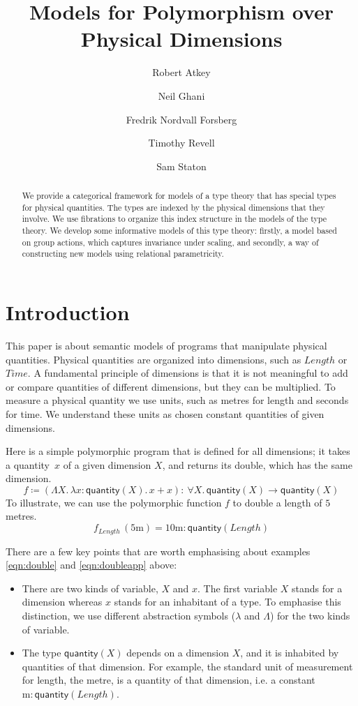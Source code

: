\documentclass[a4paper,UKenglish]{lipics}
\title{Models for Polymorphism over Physical Dimensions}
\author[1]{Robert Atkey}
\author[1]{Neil Ghani}
\author[1]{Fredrik Nordvall Forsberg}
\author[1]{Timothy Revell}
\author[2]{Sam Staton}
\affil[1]{University of Strathclyde}
\affil[2]{University of Oxford}
\theoremstyle{plain}
\newcommand{\msf}[1]{\mathsf{#1}} %
\newcommand{\qnt}{\msf{quantity}}
\newcommand{\lengthDim}{\mathit{Length}}
\newcommand{\timeDim}{\mathit{Time}}
\newcommand{\Dvar}{X}
\begin{document}
\maketitle

\begin{abstract}
We provide a categorical framework for models of a type theory that has special types for physical quantities. The types are indexed by the physical dimensions that they involve. We use fibrations to organize this index structure in the models of the type theory. We develop some informative models of this type theory: firstly, a model based on group actions, which captures invariance under scaling, and secondly, a way of constructing new models using relational parametricity.
\end{abstract}

\section{Introduction}
This paper is about semantic models of programs that manipulate physical quantities. Physical quantities are organized into dimensions, such as $\lengthDim$ or $\timeDim$. A fundamental principle of dimensions is that it is not meaningful to add or compare quantities of different dimensions, but they can be multiplied. 
%
To measure a physical quantity we use units, such as metres for length and seconds for time. We understand these units as chosen constant quantities of given dimensions.

Here is a simple polymorphic program that is defined for all dimensions; it takes a quantity~$x$ of a given dimension $X$, and returns its double, which has the same dimension.
\begin{equation}
f\coloneqq (\Lambda X.\,\lambda x:\qnt(X).\,x+x)
:\ \forall X.\,\qnt(X)\to \qnt(X)
\label{eqn:double}
\end{equation}
To illustrate, we can use the polymorphic function $f$ to double a length of $5$ metres.
\begin{equation}
f_\lengthDim\,(5\mathrm{m})=
10\mathrm{m}:\qnt(\lengthDim)
\label{eqn:doubleapp}
\end{equation}

\noindent There are a few key points that are worth emphasising about examples \eqref{eqn:double} and \eqref{eqn:doubleapp} above:
\begin{itemize}
\item There are two kinds of variable, $\Dvar$ and $x$. The first variable $\Dvar$ stands for a dimension whereas $x$ stands for an inhabitant of a type. To emphasise this distinction, we use different abstraction symbols ($\lambda$ and $\Lambda$) for the two kinds of variable.
\item The type $\qnt(\Dvar)$ depends on a dimension $\Dvar$, and it is inhabited by quantities of that dimension. For example, the standard unit of measurement for length, the metre, is a quantity of that dimension, i.e. a constant $\mathrm m:\qnt(\lengthDim)$.
\end{itemize}
\end{document}
